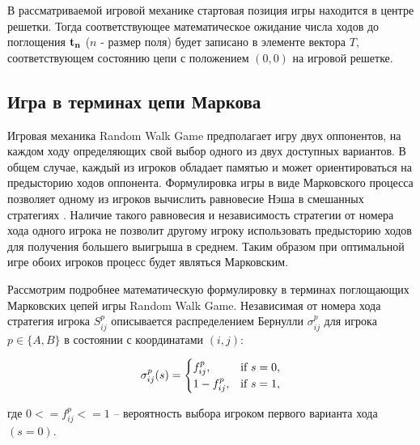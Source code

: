В рассматриваемой игровой механике стартовая позиция игры находится в центре решетки. 
Тогда соответствующее математическое ожидание числа ходов до поглощения ${\rm \bf t_n}$ ($n$ - размер поля) 
будет записано в элементе вектора $T$, соответствующем состоянию цепи с положением $(0, 0)$ на игровой решетке.

\subsection{Игра в терминах цепи Маркова}\label{subsec:ch1/sec3/sub3}

Игровая механика Random Walk Game предполагает игру двух оппонентов, на каждом ходу определяющих свой выбор одного из двух доступных вариантов.
В общем случае, каждый из игроков обладает памятью и может ориентироваться на предысторию ходов оппонента.
Формулировка игры в виде Марковского процесса позволяет одному из игроков вычислить равновесие Нэша в смешанных стратегиях \cite{}.
Наличие такого равновесия и независимость стратегии от номера хода одного игрока не позволит другому игроку использовать предысторию ходов
для получения большего выигрыша в среднем. Таким образом при оптимальной игре обоих игроков процесс будет являться Марковским.

Рассмотрим подробнее математическую формулировку в терминах поглощающих Марковских цепей игры Random Walk Game.
Независимая от номера хода стратегия игрока $S_{ij}^p$ описывается распределением Бернулли $\sigma_{ij}^p$ для игрока 
$p \in \{A, B\}$ в состоянии с координатами $(i, j)$:

\begin{equation}
    \begin{aligned}
    {\bf \sigma}_{ij}^p(s)=
    \begin{cases}
        f_{ij}^p, &\mbox{if } s = 0,\\ 
        1-f_{ij}^p, &\mbox{if } s = 1,\\
    \end{cases}
    \label{eq:sigma}
    \end{aligned}
\end{equation}

где $0 <= f_{ij}^p <= 1$ -- вероятность выбора игроком первого варианта хода $(s=0)$.

